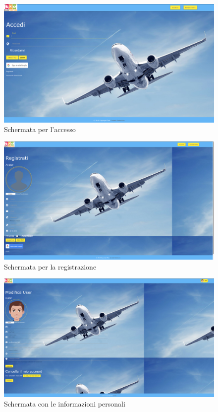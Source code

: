 \documentclass[11pt]{article}
\begin{document}
\begin{figure}[!ht]
	\includegraphics[width=1\textwidth]{./Mockup/Accesso} %
	\caption{Schermata per l'accesso}
	\label{fig:accesso}
\end{figure}

\begin{figure}[!ht]
	\includegraphics[width=1\textwidth]{./Mockup/Registrazione} %
	\caption{Schermata per la registrazione}
	\label{fig:registrazione}
\end{figure}

\begin{figure}[!ht]
	\includegraphics[width=1\textwidth]{./Mockup/Profilo-utente} %
	\caption{Schermata con le informazioni personali}
	\label{fig:profiloutente}
\end{figure}
\end{document}
